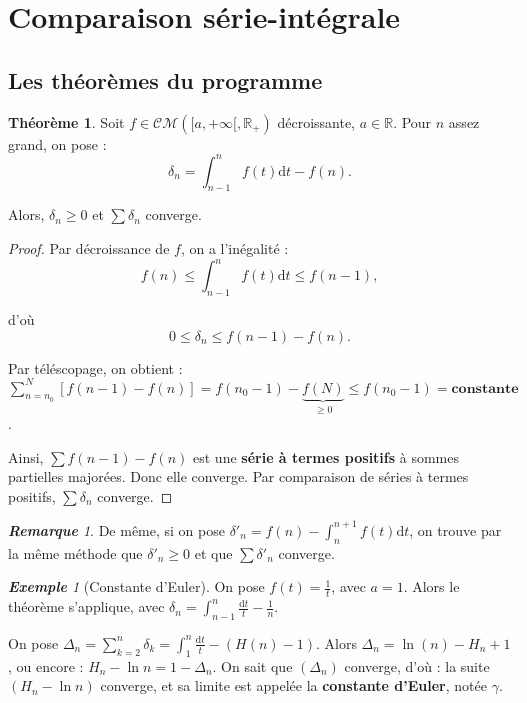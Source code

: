\documentclass[12pt]{book}
\let\ensembleNombre\mathbb
\newcommand*\R{\ensuremath{\ensembleNombre{R}}}
\newcommand{\cste}{\ensuremath{\textbf{constante}}}
\theoremstyle{definition}
\newtheorem{thme}{Théorème}[chapter]
\theoremstyle{remark}
\newtheorem*{rem}{\textbf{Remarque}}
\newtheorem*{ex}{\textbf{Exemple}}
\newenvironment{fthme}
  {\begin{mdframed}[roundcorner=10pt, linewidth=2pt]\begin{thme}}
  {\end{thme}\end{mdframed}}
\begin{document}
	\section{Comparaison série-intégrale}
		\subsection{Les théorèmes du programme}
	\begin{fthme}
	Soit $f \in \mathcal{CM}\left([a, +\infty[, \R_+ \right)$ décroissante, $a \in \R$. Pour $n$ assez grand, on pose : 
	\[\delta_n = \int_{n-1}^n f(t)\mathrm{d}t - f(n).\]
	
	Alors, $\delta_n \geq 0$ et $\sum \delta_n$ converge.
	\end{fthme}
	\begin{proof}
	Par décroissance de $f$, on a l'inégalité :
	\[ f(n) \leq \int_{n-1}^n f(t) \mathrm{d}t \leq f(n-1),\]

	d'où 	
	\[0 \leq \delta_n \leq f(n-1) - f(n).\]
	
	Par téléscopage, on obtient : $\sum_{n=n_0}^N [f(n-1) - f(n)] = f(n_0 - 1) - \underbrace{f(N)}_{\geq 0} \leq f(n_0 - 1) = \cste$.
	
	Ainsi, $\sum f(n-1) - f(n)$ est une \textbf{série à termes positifs} à sommes partielles majorées. Donc elle converge. Par comparaison de séries à termes positifs, $\sum \delta_n$ converge.
	\end{proof}
	
	\begin{rem}
	De même, si on pose $\delta'_n = f(n) - \int_n^{n+1} f(t)\mathrm{d}t$, on trouve par la même méthode que $\delta'_n \geq 0$ et que $\sum \delta'_n$ converge.
	\end{rem}
	
	\begin{ex}[Constante d'Euler] 
	On pose $f(t) = \frac{1}{t}$, avec $a = 1$. Alors le théorème s'applique, avec $\delta_n = \int_{n-1}^n \frac{\mathrm{d}t}{t} - \frac{1}{n}$.
	
	On pose $\Delta_n = \sum_{k=2}^n \delta_k = \int_1^n \frac{\mathrm{d}t}{t} - (H(n) - 1)$. Alors $\Delta_n = \ln (n) - H_n + 1$, ou encore : $H_n - \ln n = 1 - \Delta_n$. On sait que $(\Delta_n)$ converge, d'où : la suite $(H_n - \ln n)$ converge, et sa limite est appelée la \textbf{constante d'Euler}, notée $\gamma$.
	\end{ex}
	
\end{document}
